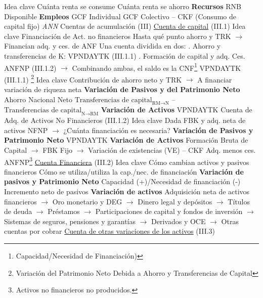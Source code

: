 \documentclass{nuevotema}
\begin{document}
\begin{esquemal}
				\4 Idea clave
				\4[] Cuánta renta se consume
				\4[] Cuánta renta se ahorro
				\4 \textbf{Recursos}
				\4[] RNB Disponible
				\4 \textbf{Empleos}
				\4[] GCF Individual
				\4[] GCF Colectivo
				\4[] 
				\4[] -- CKF (Consumo de capital fijo)
				\4[] \textit{ANN}
		\2 Cuentas de acumulación (III)
			\3 \underline{Cuenta de capital} (III.1)
				\4 Idea clave
				\4[] Financiación de Act. no financieros
				\4[] Hasta qué punto ahorro y TRK
				\4[] $\to$ Financian adq. y ces. de ANF
				\4 Una cuenta dividida en dos:
				. Ahorro y transferencias de K: VPNDAYTK (III.1.1)
				. Formación de capital y adq. Ces. ANFNP (III.1.2)
				\4[] $\to$  Combinando ambas, el saldo es la CNF\footnote{Capacidad/Necesidad de Financiación)}
			\3 VPNDAYTK (III.1.1) \footnote{Variación del Patrimonio Neto Debida a Ahorro y Transferencias de Capital}
				\4 Idea clave
				\4[] Contribución de ahorro neto y TRK
				\4[] $\to$ A financiar variación de riqueza neta
				\4 \textbf{Variación de Pasivos y del Patrimonio Neto}
				\4[] Ahorro Nacional Neto
				\4[] $\text{Transferencias de capital}_{\text{RM} \to \text{N}}$
				\4[] -- $\text{Transferencias de capital}_{\text{N}\to \text{RM}}$
				\4 \textbf{Variación de Activos}
				\4[] VPNDAYTK
			\3 Cuenta de Adq. de Activos No Financieros (III.1.2)
				\4 Idea clave
				\4[] Dada FBK y adq. neta de activos NFNP
				\4[] $\to$ ¿Cuánta financiación es necesaria?
				\4 \textbf{Variación de Pasivos y Patrimonio Neto}
				\4[] VPNDAYTK
				\4 \textbf{Variación de Activos}
				\4[] Formación Bruta de Capital
				\4[] $\to$ FBK Fijo
				\4[] $\to$ Variación de existencias (VE)
				\4[]  -- CKF
				\4[] Adq. menos ces. ANFNP\footnote{Activos no financieros no producidos.}
				\4[] 
			\3 \underline{Cuenta Financiera} (III.2)
				\4 Idea clave
				\4[] Cómo cambian activos y pasivos financieros
				\4[] Cómo se utiliza/utiliza la cap./nec. de financiación
				\4 \textbf{Variación de pasivos y Patrimonio Neto}
				\4[] Capacidad (+)/Necesidad de financiación (-)
				\4[] Incremento neto de pasivos
				\4 \textbf{Variación de activos}
				\4[] Adquisición neta de activos financieros
				\4[] $\to$ Oro monetario y DEG
				\4[] $\to$ Dinero legal y depósitos
				\4[] $\to$ Títulos de deuda
				\4[] $\to$ Préstamos
				\4[] $\to$ Participaciones de capital y fondos de inversión
				\4[] $\to$ Sistemas de seguros, pensiones y garantías
				\4[] $\to$ Derivados y OCE
				\4[] $\to$ Otras cuentas por cobrar
			\3 \underline{Cuenta de otras variaciones de los activos} (III.3)

\end{esquemal}
\end{document}
